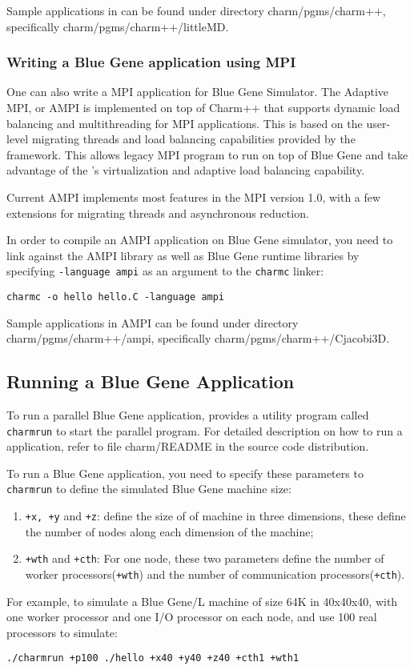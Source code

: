 Sample applications in \charmpp{} can be found under directory
charm/pgms/charm++, specifically charm/pgms/charm++/littleMD.

\subsubsection{Writing a Blue Gene application using MPI}

One can also write a MPI application for Blue Gene Simulator.
The Adaptive MPI, or AMPI is implemented on top of Charm++ that supports
dynamic load balancing and multithreading for MPI applications. This is based
on the user-level migrating threads and load balancing capabilities provided
by the \charmpp{} framework. This allows legacy MPI program to run 
on top of Blue Gene \charmpp{} and take advantage of the \charmpp{}'s
virtualization and adaptive load balancing capability.

Current AMPI implements most features in the MPI version 1.0, with a few
extensions for migrating threads and asynchronous reduction.

In order to compile an AMPI application on Blue Gene simulator, you need 
to link against the AMPI library as well as Blue Gene \charmpp{} runtime
libraries by specifying \texttt{-language ampi} as an argument to 
the {\tt charmc} linker:
\begin{verbatim}
charmc -o hello hello.C -language ampi
\end{verbatim}

Sample applications in AMPI can be found under directory
charm/pgms/charm++/ampi, specifically charm/pgms/charm++/Cjacobi3D.

\subsection{Running a Blue Gene Application}

To run a parallel Blue Gene application, \charmpp{} provides a utility program
called {\tt charmrun} to start the parallel program. 
For detailed description on how to run a \charmpp{} application, 
refer to file charm/README in the source code distribution.

To run a Blue Gene application, you need to specify these parameters to 
{\tt charmrun} to define the simulated Blue Gene machine size:
\begin{enumerate}
\item {\tt +x, +y} and {\tt +z}:  define the size of of machine in three dimensions, these define the number of nodes along each dimension of the machine;
\item {\tt +wth} and {\tt +cth}:  For one node, these two parameters define the number of worker processors({\tt +wth}) and the number of communication processors({\tt +cth}).
\end{enumerate}

For example, to simulate a Blue Gene/L machine of size 64K in 40x40x40, with 
one worker processor and one I/O processor on each node, and use 100 
real processors to simulate:
\begin{verbatim}
./charmrun +p100 ./hello +x40 +y40 +z40 +cth1 +wth1
\end{verbatim}


